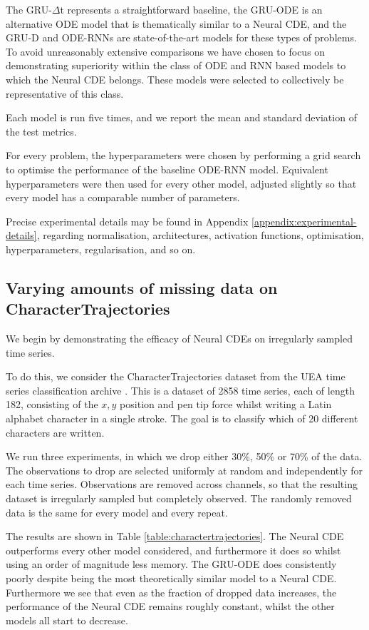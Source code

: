 \documentclass{article}
\theoremstyle{plain}
\theoremstyle{definition}
\begin{document}
	The GRU-$\Delta$t represents a straightforward baseline, the GRU-ODE is an alternative ODE model that is thematically similar to a Neural CDE, and the GRU-D and ODE-RNNs are state-of-the-art models for these types of problems. To avoid unreasonably extensive comparisons we have chosen to focus on demonstrating superiority within the class of ODE and RNN based models to which the Neural CDE belongs. These models were selected to collectively be representative of this class.
	
	
	Each model is run five times, and we report the mean and standard deviation of the test metrics.
	
	For every problem, the hyperparameters were chosen by performing a grid search to optimise the performance of the baseline ODE-RNN model. Equivalent hyperparameters were then used for every other model, adjusted slightly so that every model has a comparable number of parameters.
	
	Precise experimental details may be found in Appendix \ref{appendix:experimental-details}, regarding normalisation, architectures, activation functions, optimisation, hyperparameters, regularisation, and so on.
	
	\subsection{Varying amounts of missing data on CharacterTrajectories}
	We begin by demonstrating the efficacy of Neural CDEs on irregularly sampled time series.
	
	To do this, we consider the CharacterTrajectories dataset from the UEA time series classification archive \cite{uea}. This is a dataset of 2858 time series, each of length 182, consisting of the $x, y$ position and pen tip force whilst writing a Latin alphabet character in a single stroke. The goal is to classify which of 20 different characters are written.
	
	We run three experiments, in which we drop either 30\%, 50\% or 70\% of the data. The observations to drop are selected uniformly at random and independently for each time series. Observations are removed across channels, so that the resulting dataset is irregularly sampled but completely observed. The randomly removed data is the same for every model and every repeat.
	
	The results are shown in Table \ref{table:charactertrajectories}. The Neural CDE outperforms every other model considered, and furthermore it does so whilst using an order of magnitude less memory. The GRU-ODE does consistently poorly despite being the most theoretically similar model to a Neural CDE. Furthermore we see that even as the fraction of dropped data increases, the performance of the Neural CDE remains roughly constant, whilst the other models all start to decrease.
	
\end{document}
